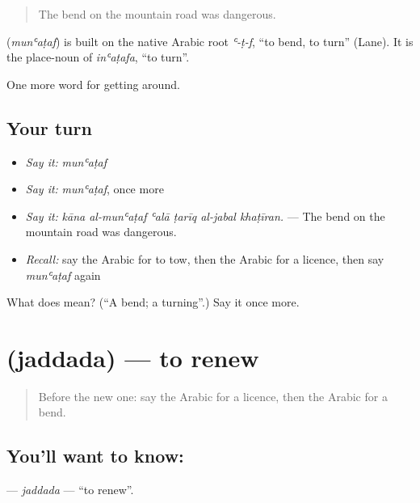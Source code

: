 \begin{quote}
The bend on the mountain road was dangerous.
\end{quote}

\begin{cousinweb}
\textbf{} (\emph{munʿaṭaf}) is built on the native Arabic root \emph{ʿ-ṭ-f}, \textquotedblleft{}to bend, to turn\textquotedblright{} (Lane). It is the place-noun of \emph{inʿaṭafa}, \textquotedblleft{}to turn\textquotedblright{}.
\end{cousinweb}

\begin{grammarlens}[title={What you've built}]
One more word for getting around.
\end{grammarlens}

\subsection*{Your turn}
\begin{itemize}
\raggedright
  \item \emph{Say it:} \emph{munʿaṭaf}
  \item \emph{Say it:} \emph{munʿaṭaf}, once more
  \item \emph{Say it:} \emph{kāna al-munʿaṭaf ʿalā ṭarīq al-jabal khaṭīran.} — The bend on the mountain road was dangerous.
  \item \emph{Recall:} say the Arabic for to tow, then the Arabic for a licence, then say \emph{munʿaṭaf} again
\end{itemize}

\begin{tcolorbox}[breakable,colback=teal!4,colframe=teal!35!black,title={Before you move on}]
What does  mean? (\textquotedblleft{}A bend; a turning\textquotedblright{}.) Say it once more.
\end{tcolorbox}
\section[\texorpdfstring{\ar{جدد} (jaddada)}{جدد (jaddada)}]{ (jaddada) — to renew}

\label{lesson:AR-C434-jaddada}



\begin{quote}
Before the new one: say the Arabic for a licence, then the Arabic for a bend.
\end{quote}

\subsection*{You'll want to know: }
\textbf{} — \emph{jaddada} — \textquotedblleft{}to renew\textquotedblright{}.

